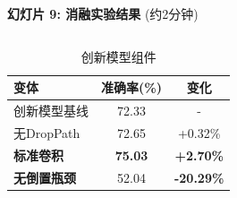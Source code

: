 \documentclass[10pt]{beamer}
\begin{document}
\begin{frame}{\textbf{幻灯片 9: 消融实验结果} (约2分钟)}
\begin{columns}[T]
\begin{column}{0.49\textwidth}
        \vspace{0.5em}
        \begin{table}[h]
        \centering
        {\scriptsize
        \begin{tabular}{|l|c|c|}
        \hline
        变体 & 准确率(\%) & 变化 \\
        \hline
        创新模型基线 & 72.33 & - \\
        无DropPath & 72.65 & +0.32\% \\
        \textbf{标准卷积} & \textbf{75.03} & \textbf{+2.70\%} \\
        \textbf{无倒置瓶颈} & 52.04 & \textbf{-20.29\%} \\
        \hline
        \end{tabular}
        \caption{创新模型组件}}
        \end{table}
    \end{column}
\end{columns}

\end{frame}
\end{document}
